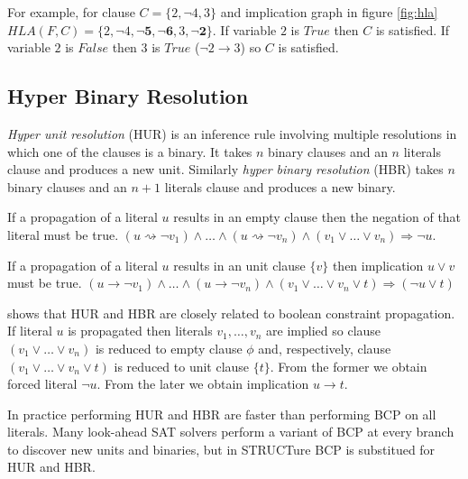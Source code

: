 For example, for clause $C = \{ 2, \neg 4, 3\}$ and implication graph
in figure \ref{fig:hla} $HLA(F, C) = \{2, \neg 4, \mathbf{\neg 5,
\neg 6}, 3, \mathbf{\neg 2} \}$.  If variable $2$ is $True$ then
$C$ is satisfied. If variable $2$ is $False$ then $3$ is $True$
($\neg 2 \rightarrow 3$) so $C$ is satisfied.


\subsection{Hyper Binary Resolution}
\label{ssec:hbr}

\emph{Hyper unit resolution} (HUR) \cite{Kusper02solvingthe} is
an inference rule involving multiple resolutions in which one of
the clauses is a binary. It takes $n$ binary clauses and an $n$
literals clause and produces a new unit.  Similarly \emph{hyper
binary resolution} (HBR) \cite{Bacchus03effectivepreprocessing} takes
$n$ binary clauses and an $n + 1$ literals clause and produces a
new binary.

\begin{myprop}
  If a propagation of a literal $u$ results in an empty clause then
  the negation of that literal must be true.
  $(u \rightsquigarrow \neg v_1) \land \ldots
  \land (u \rightsquigarrow \neg v_n) \land (v_1 \lor \dots \lor v_n)
  \Rightarrow \neg u$. 
\end{myprop}

\begin{myprop}
  If a propagation of a literal $u$ results in an unit clause $\{ v \}$
  then implication $u \lor v$ must be true.
  $(u \rightarrow \neg v_1) \land \ldots
  \land (u \rightarrow \neg v_n)
  \land (v_1 \lor \dots \lor v_n \lor t) \Rightarrow (\neg u \lor t)$
\end{myprop}

\cite{Bacchus03effectivepreprocessing} shows that HUR and HBR are
closely related to boolean constraint propagation.  If literal $u$
is propagated then literals $v_1, \ldots, v_n$ are implied so clause
$(v_1 \lor \dots \lor v_n)$ is reduced to empty clause $\phi$ and,
respectively, clause $(v_1 \lor \dots \lor v_n \lor t)$ is reduced
to unit clause $\{ t \}$. From the former we obtain forced literal
$\neg u$. From the later we obtain implication $u \rightarrow t$.

In practice performing HUR and HBR are faster than performing BCP on
all literals. Many look-ahead SAT solvers perform a variant of BCP
\cite{Freeman:1995:IPS:220639} at every branch to discover new units
and binaries, but in STRUCTure BCP is substitued for HUR and HBR.


